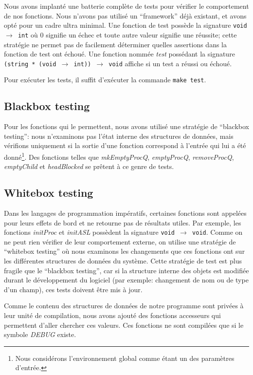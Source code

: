 \documentclass[10pt]{article}
\begin{document}
Nous avons implanté une batterie complète de tests pour vérifier le
comportement de nos fonctions.  Nous n'avons pas utilisé un
``framework'' déjà existant, et avons opté pour un cadre ultra
minimal.  Une fonction de test possède la signature {\tt void $\to$
  int} où 0 signifie un échec et toute autre valeur signifie une
réussite; cette stratégie ne permet pas de facilement déterminer
quelles assertions dans la fonction de test ont échoué.  Une fonction
nommée \emph{test} possédant la signature {\tt (string * (void $\to$
  int)) $\to$ void} affiche si un test a réussi ou échoué.

Pour exécuter les tests, il suffit d'exécuter la commande {\tt make
  test}.

\subsection{Blackbox testing}

Pour les fonctions qui le permettent, nous avons utilisé une stratégie
de ``blackbox testing'': nous n'examinons pas l'état interne des
structures de données, mais vérifions uniquement si la sortie d'une
fonction correspond à l'entrée qui lui a été donné\footnote{Nous
  considérons l'environnement global comme étant un des paramètres
  d'entrée.}.  Des fonctions telles que \emph{mkEmptyProcQ},
\emph{emptyProcQ}, \emph{removeProcQ}, \emph{emptyChild} et
\emph{headBlocked} se prêtent à ce genre de tests.

\subsection{Whitebox testing}

Dans les langages de programmation impératifs, certaines fonctions
sont appelées pour leurs effets de bord et ne retourne pas de
résultats utiles.  Par exemple, les fonctions \emph{initProc} et
\emph{initASL} possèdent la signature {\tt void $\to$ void}.  Comme on
ne peut rien vérifier de leur comportement externe, on utilise une
stratégie de ``whitebox testing'' où nous examinons les changements
que ces fonctions ont sur les différentes structures de données du
système.  Cette stratégie de test est plus fragile que le ``blackbox
testing'', car si la structure interne des objets est modifiée durant
le développement du logiciel (par exemple: changement de nom ou de
type d'un champ), ces tests doivent être mis à jour.

Comme le contenu des structures de données de notre programme sont
privées à leur unité de compilation, nous avons ajouté des fonctions
accesseurs qui permettent d'aller chercher ces valeurs.  Ces fonctions
ne sont compilées que si le symbole \emph{DEBUG} existe.
\end{document}
